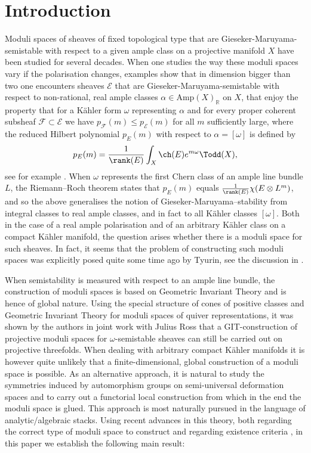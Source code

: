 \section{Introduction}

Moduli spaces of sheaves of fixed topological type that are Gieseker-Maruyama-semistable with respect to a given ample class on a projective manifold $X$ have been studied for several decades. When one studies the way these moduli spaces vary if the polarisation changes, examples show that in dimension bigger than two one encounters sheaves $\mathcal{E}$ that are Gieseker-Maruyama-semistable with respect to non-rational, real ample classes $\alpha \in \mathrm{Amp}(X)_\mathbb{R}$ on $X$, \ie that enjoy the property that for a Kähler form $\omega$ representing $\alpha$ and for every proper coherent subsheaf $\mathcal{F} \subset \mathcal{E}$ we have $p_{\mathcal{F}}(m) \leq p_\mathcal{E}(m)$ for all $m$ sufficiently large, where the reduced Hilbert polynomial $p_E(m)$ with respect to $\alpha = [\omega]$ is defined by
\[p_E(m) = \frac{1}{\rank(E)}\int_X \ch(E) e^{m\omega} \Todd(X),\]see for example \cite{GRTsurvey}. When $\omega$ represents the first Chern class of an ample line bundle $L$, the Riemann--Roch theorem states that $p_{E}(m)$ equals $\frac{1}{\rank(E)} \chi(E\otimes L^m)$, and so the above generalises the notion of Gieseker-Maruyama--stability from integral classes to real ample classes, and in fact to all Kähler classes $[\omega]$. Both in the case of a real ample polarisation and of an arbitrary Kähler class on a compact Kähler manifold, the question arises whether there is a moduli space for such sheaves. In fact, it seems that the problem of constructing such moduli spaces was explicitly posed quite some time ago by Tyurin, see the discussion in \cite[\S 3.2]{TelemanCommContMath}.

When semistability is measured with respect to an ample line bundle, the construction of moduli spaces is based on Geometric Invariant Theory and is hence of global nature. Using the special structure of cones of positive classes and Geometric Invariant Theory for moduli spaces of quiver representations, it was shown by the authors in joint work \cite{GRT1} with Julius Ross that a GIT-construction of projective moduli spaces for $\omega$-semistable sheaves can still be carried out on projective threefolds. When dealing with arbitrary compact Kähler manifolds it is however quite unlikely that a finite-dimensional, global construction of a moduli space is possible. As an alternative approach, it is natural to study the symmetries induced by automorphism groups on semi-universal deformation spaces and to carry out a functorial local construction from which in the end the moduli space is glued. This approach is most naturally pursued in the language of analytic/algebraic stacks. Using recent advances in this theory, both regarding the correct type of moduli space to construct \cite{Alper13} and regarding existence criteria \cite{AlperFS}, in this paper we establish the following main result:

